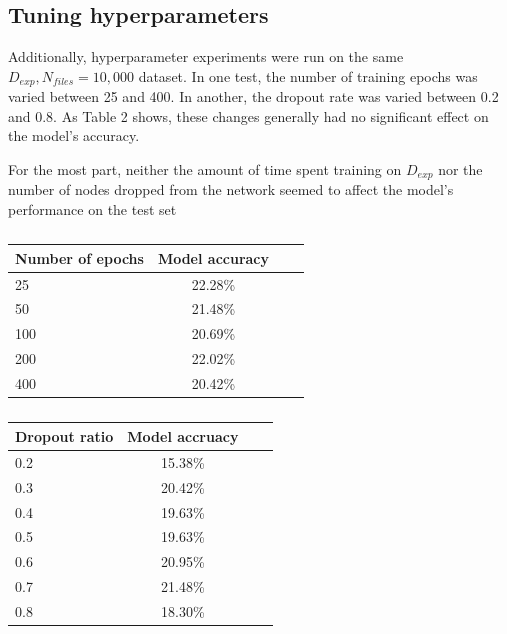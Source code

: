\documentclass{article}
\begin{document}
\subsection{Tuning hyperparameters}

Additionally, hyperparameter experiments were run on the same $D_{exp}, N_{files} = 10,000$ dataset. In one test, the number of training epochs was varied between 25 and 400. In another, the dropout rate was varied between 0.2 and 0.8. As Table 2 shows, these changes generally had no significant effect on the model's accuracy.

\begin{table}[!htb]
    \caption{For the most part, neither the amount of time spent training on $D_{exp}$ nor the number of nodes dropped from the network seemed to affect the model's performance on the test set}
    \begin{subtable}{.5\linewidth}
      \caption{}
      \centering
        \begin{tabular}{l*{3}{c}}
\toprule
Number of epochs   &   Model accuracy\\
\midrule
25           & 22.28\%  \\
50               &   21.48\%   \\
100                &   20.69\%   \\
200                &   22.02\%   \\
400                &   20.42\%   \\

\bottomrule
\end{tabular}
    \end{subtable}%
    \begin{subtable}{.5\linewidth}
      \centering
        \caption{}
        \begin{tabular}{l*{3}{c}}
\toprule
Dropout ratio  &   Model accruacy \\
\midrule
0.2           & 15.38\%  \\
0.3                &   20.42\%   \\
0.4                &   19.63\%   \\
0.5                &   19.63\%   \\
0.6                &   20.95\%   \\
0.7                &   21.48\%   \\
0.8               &   18.30\%   \\

\bottomrule
\end{tabular}
    \end{subtable} 
\end{table}
\end{document}
